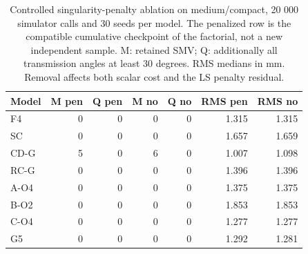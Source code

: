 \begin{table}[H]
\caption{Controlled singularity-penalty ablation on medium/compact, 20 000 simulator calls and 30 seeds per model. The penalized row is the compatible cumulative checkpoint of the factorial, not a new independent sample. M: retained SMV; Q: additionally all transmission angles at least 30 degrees. RMS medians in mm. Removal affects both scalar cost and the LS penalty residual.}
\label{tab:v2_penalty}
\centering
\small
\begin{tabular}{@{}lrrrrrr@{}}
\toprule
Model & M pen & Q pen & M no & Q no & RMS pen & RMS no \\
\midrule
F4 & 0 & 0 & 0 & 0 & 1.315 & 1.315 \\
SC & 0 & 0 & 0 & 0 & 1.657 & 1.659 \\
CD-G & 5 & 0 & 6 & 0 & 1.007 & 1.098 \\
RC-G & 0 & 0 & 0 & 0 & 1.396 & 1.396 \\
A-O4 & 0 & 0 & 0 & 0 & 1.375 & 1.375 \\
B-O2 & 0 & 0 & 0 & 0 & 1.853 & 1.853 \\
C-O4 & 0 & 0 & 0 & 0 & 1.277 & 1.277 \\
G5 & 0 & 0 & 0 & 0 & 1.292 & 1.281 \\
\bottomrule
\end{tabular}
\end{table}
